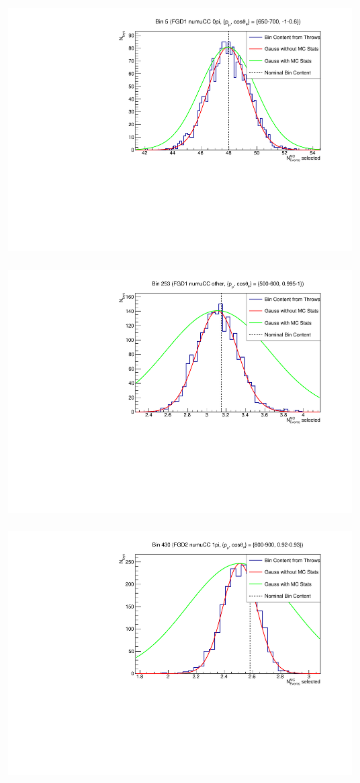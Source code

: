 \begin{figure}[h]
\centering
\begin{subfigure}{.49\textwidth}
  \centering
  \includegraphics[width=0.95\linewidth]{figs/detbin_allsysts5}
\end{subfigure}
\begin{subfigure}{.49\textwidth}
  \centering
  \includegraphics[width=0.95\linewidth]{figs/detbin_allsysts253}
\end{subfigure}
\begin{subfigure}{.49\textwidth}
  \centering
  \includegraphics[width=0.95\linewidth]{figs/detbin_allsysts430}

\end{subfigure}
\end{figure}
